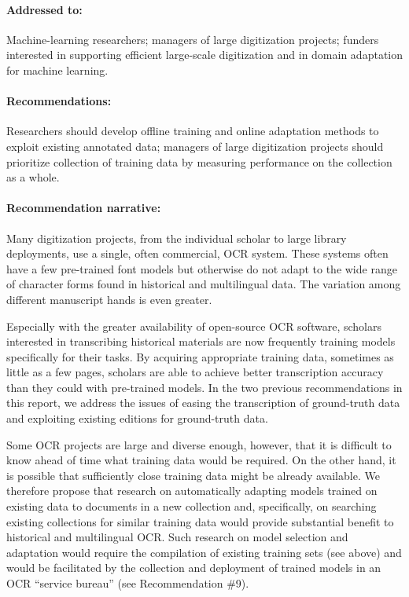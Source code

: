 \documentclass[twoside,11pt]{report}
\begin{document}
\paragraph{Addressed to:} Machine-learning researchers; managers of large digitization projects; funders interested in supporting efficient large-scale digitization and in domain adaptation for machine learning.

\paragraph{Recommendations:} Researchers should develop offline training and online adaptation methods to exploit existing annotated data; managers of large digitization projects should prioritize collection of training data by measuring performance on the collection as a whole.

\paragraph{Recommendation narrative:}

Many digitization projects, from the individual scholar to large library deployments, use a single, often commercial, OCR system. These systems often have a few pre-trained font models but otherwise do not adapt to the wide range of character forms found in historical and multilingual data. The variation among different manuscript hands is even greater.

Especially with the greater availability of open-source OCR software, scholars interested in transcribing historical materials are now frequently training models specifically for their tasks. By acquiring appropriate training data, sometimes as little as a few pages, scholars are able to achieve better transcription accuracy than they could with pre-trained models. In the two previous recommendations in this report, we address the issues of easing the transcription of ground-truth data and exploiting existing editions for ground-truth data.

Some OCR projects are large and diverse enough, however, that it is difficult to know ahead of time what training data would be required. On the other hand, it is possible that sufficiently close training data might be already available. We therefore propose that research on automatically adapting models trained on existing data to documents in a new collection and, specifically, on searching existing collections for similar training data would provide substantial benefit to historical and multilingual OCR. Such research on model selection and adaptation would require the compilation of existing training sets (see above) and would be facilitated by the collection and deployment of trained models in an OCR ``service bureau'' (see Recommendation \#9).
\end{document}
